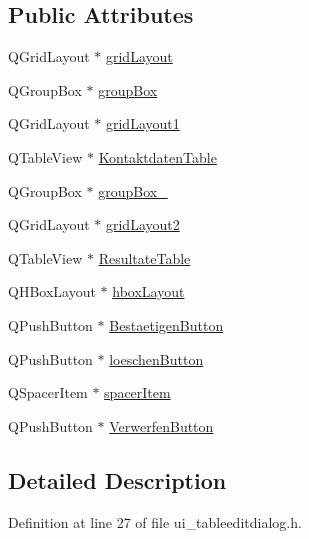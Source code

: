 \subsection*{Public Attributes}
\begin{CompactItemize}
\item 
QGridLayout $\ast$ \hyperlink{class_ui___table_edit_dialog_class_c2430c3aa774dccb4871d830b15253ca}{gridLayout}
\item 
QGroupBox $\ast$ \hyperlink{class_ui___table_edit_dialog_class_28b300c690a4f3ca0a883522d313523e}{groupBox}
\item 
QGridLayout $\ast$ \hyperlink{class_ui___table_edit_dialog_class_0b5da6fae78eda462f424a3883109de5}{gridLayout1}
\item 
QTableView $\ast$ \hyperlink{class_ui___table_edit_dialog_class_7127dc0106c562fc097ca9be9ba55b03}{KontaktdatenTable}
\item 
QGroupBox $\ast$ \hyperlink{class_ui___table_edit_dialog_class_49d6ba9f4ecdd0db27c421a442ab2648}{groupBox\_}
\item 
QGridLayout $\ast$ \hyperlink{class_ui___table_edit_dialog_class_05d9b832d1b595f32791290777119c15}{gridLayout2}
\item 
QTableView $\ast$ \hyperlink{class_ui___table_edit_dialog_class_49cbc22d11fa57a282ac9e3b9a93fadd}{ResultateTable}
\item 
QHBoxLayout $\ast$ \hyperlink{class_ui___table_edit_dialog_class_75664dfae4f088d5bb91b5bbbb989e7a}{hboxLayout}
\item 
QPushButton $\ast$ \hyperlink{class_ui___table_edit_dialog_class_e37f5f2d1f208ca7d32201e2781b5886}{BestaetigenButton}
\item 
QPushButton $\ast$ \hyperlink{class_ui___table_edit_dialog_class_b6c29b0ffda82912df837a47203f8ff3}{loeschenButton}
\item 
QSpacerItem $\ast$ \hyperlink{class_ui___table_edit_dialog_class_524dc1c83939859e38ac60e68c7672b0}{spacerItem}
\item 
QPushButton $\ast$ \hyperlink{class_ui___table_edit_dialog_class_c52944369c75cb418ac1c307acb6f04c}{VerwerfenButton}
\end{CompactItemize}


\subsection{Detailed Description}


Definition at line 27 of file ui\_\-tableeditdialog.h.

